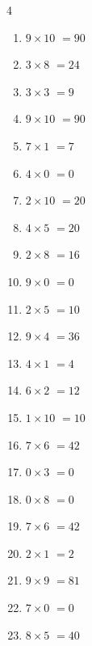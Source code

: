 \begin{multicols}{4}
\begin{enumerate}
  \item $9\times 10$
        $=90$

  \item $3\times 8$
        $=24$

  \item $3\times 3$
        $=9$

  \item $9\times 10$
        $=90$

  \item $7\times 1$
        $=7$

  \item $4\times 0$
        $=0$

  \item $2\times 10$
        $=20$

  \item $4\times 5$
        $=20$

  \item $2\times 8$
        $=16$

  \item $9\times 0$
        $=0$

  \item $2\times 5$
        $=10$

  \item $9\times 4$
        $=36$

  \item $4\times 1$
        $=4$

  \item $6\times 2$
        $=12$

  \item $1\times 10$
        $=10$

  \item $7\times 6$
        $=42$

  \item $0\times 3$
        $=0$

  \item $0\times 8$
        $=0$

  \item $7\times 6$
        $=42$

  \item $2\times 1$
        $=2$

  \item $9\times 9$
        $=81$

  \item $7\times 0$
        $=0$

  \item $8\times 5$
        $=40$


\end{enumerate}
\end{multicols}
